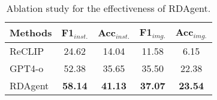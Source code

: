\begin{table}[t]
\caption{Ablation study for the effectiveness of RDAgent.}

\label{tab:agent_ablation}
  \centering
\begin{adjustbox}{width=\linewidth}
  \begin{tabular}{l  c  c c c }
    \toprule
    Methods & F1$_{inst.}$ & Acc$_{inst.}$ & F1$_{img.}$ & Acc$_{img.}$ \\
    \midrule 
ReCLIP~\cite{reclip}  & 24.62 & 14.04 & 11.58 & 6.15 \\

GPT4-o  & 52.38 & 35.65 & 35.50 & 22.38 \\


RDAgent &  \textbf{58.14}  & \textbf{41.13} & \textbf{37.07}  & \textbf{23.54} \\

  \bottomrule

\end{tabular}
\end{adjustbox}

\end{table}
